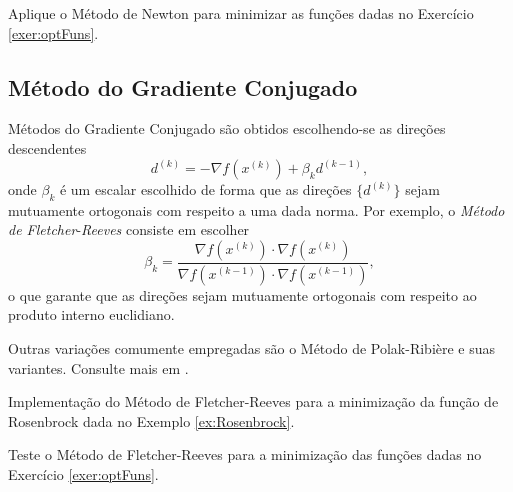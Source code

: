 \begin{exer}
  Aplique o Método de Newton para minimizar as funções dadas no Exercício \ref{exer:optFuns}.
\end{exer}

\subsection{Método do Gradiente Conjugado}

Métodos do Gradiente Conjugado são obtidos escolhendo-se as direções descendentes
\begin{equation}
  d^{(k)} = -\nabla f(x^{(k)}) + \beta_k d^{(k-1)},
\end{equation}
onde $\beta_k$ é um escalar escolhido de forma que as direções $\{d^{(k)}\}$ sejam mutuamente ortogonais com respeito a uma dada norma. Por exemplo, o \emph{Método de Fletcher}-\emph{Reeves} consiste em escolher
\begin{equation}
  \beta_k = \frac{\nabla f(x^{(k)})\cdot\nabla f(x^{(k)})}{\nabla f(x^{(k-1)})\cdot\nabla f(x^{(k-1)})},
\end{equation}
o que garante que as direções sejam mutuamente ortogonais com respeito ao produto interno euclidiano.

\begin{obs}
  Outras variações comumente empregadas são o Método de Polak-Ribière e suas variantes. Consulte mais em \cite[Seção 5.2]{Nocedal2006}.
\end{obs}

\begin{ex}
  Implementação do Método de Fletcher-Reeves para a minimização da função de Rosenbrock dada no Exemplo \ref{ex:Rosenbrock}.
  
      
\end{ex}

\begin{exer}
  Teste o Método de Fletcher-Reeves para a minimização das funções dadas no Exercício \ref{exer:optFuns}.
\end{exer}